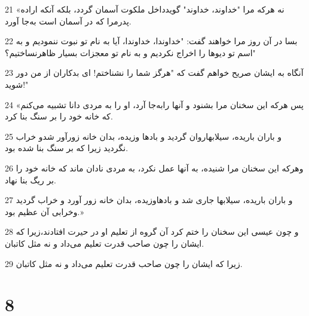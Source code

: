 \par 21 «نه هر‌که مرا "خداوند، خداوند" گویدداخل ملکوت آسمان گردد، بلکه آنکه اراده پدرمرا که در آسمان است به‌جا آورد.
\par 22 بسا در آن روز مرا خواهند گفت: "خداوندا، خداوندا، آیا به نام تو نبوت ننمودیم و به اسم تو دیوها را اخراج نکردیم و به نام تو معجزات بسیار ظاهرنساختیم؟"
\par 23 آنگاه به ایشان صریح خواهم گفت که "هرگز شما را نشناختم! ای بدکاران از من دور شوید!"
\par 24 «پس هر‌که این سخنان مرا بشنود و آنها رابه‌جا آرد، او را به مردی دانا تشبیه می‌کنم که خانه خود را بر سنگ بنا کرد.
\par 25 و باران باریده، سیلابهاروان گردید و بادها وزیده، بدان خانه زورآور شدو خراب نگردید زیرا که بر سنگ بنا شده بود.
\par 26 وهر‌که این سخنان مرا شنیده، به آنها عمل نکرد، به مردی نادان ماند که خانه خود را بر ریگ بنا نهاد.
\par 27 و باران باریده، سیلابها جاری شد و بادهاوزیده، بدان خانه زور آورد و خراب گردید وخرابی آن عظیم بود.»
\par 28 و چون عیسی این سخنان را ختم کرد آن گروه از تعلیم او در حیرت افتادند،زیرا که ایشان را چون صاحب قدرت تعلیم می‌داد و نه مثل کاتبان.
\par 29 زیرا که ایشان را چون صاحب قدرت تعلیم می‌داد و نه مثل کاتبان.

\chapter{8}

